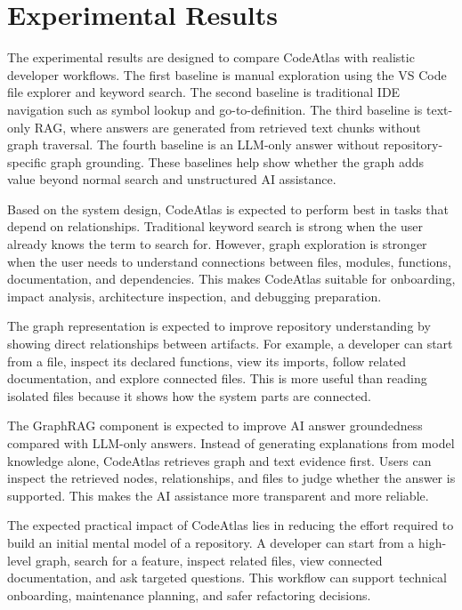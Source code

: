 \documentclass[conference]{IEEEtran}
\begin{document}
\section{Experimental Results}
The experimental results are designed to compare CodeAtlas with realistic developer workflows. The first baseline is manual exploration using the VS Code file explorer and keyword search. The second baseline is traditional IDE navigation such as symbol lookup and go-to-definition. The third baseline is text-only RAG, where answers are generated from retrieved text chunks without graph traversal. The fourth baseline is an LLM-only answer without repository-specific graph grounding. These baselines help show whether the graph adds value beyond normal search and unstructured AI assistance.

Based on the system design, CodeAtlas is expected to perform best in tasks that depend on relationships. Traditional keyword search is strong when the user already knows the term to search for. However, graph exploration is stronger when the user needs to understand connections between files, modules, functions, documentation, and dependencies. This makes CodeAtlas suitable for onboarding, impact analysis, architecture inspection, and debugging preparation.

The graph representation is expected to improve repository understanding by showing direct relationships between artifacts. For example, a developer can start from a file, inspect its declared functions, view its imports, follow related documentation, and explore connected files. This is more useful than reading isolated files because it shows how the system parts are connected.

The GraphRAG component is expected to improve AI answer groundedness compared with LLM-only answers. Instead of generating explanations from model knowledge alone, CodeAtlas retrieves graph and text evidence first. Users can inspect the retrieved nodes, relationships, and files to judge whether the answer is supported. This makes the AI assistance more transparent and more reliable.

The expected practical impact of CodeAtlas lies in reducing the effort required to build an initial mental model of a repository. A developer can start from a high-level graph, search for a feature, inspect related files, view connected documentation, and ask targeted questions. This workflow can support technical onboarding, maintenance planning, and safer refactoring decisions.
\end{document}
